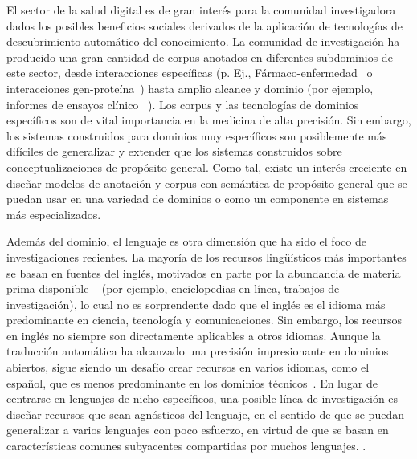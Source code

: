 El sector de la salud digital es de gran interés para la comunidad investigadora dados los posibles beneficios sociales derivados de la aplicación de tecnologías de descubrimiento automático del conocimiento. La comunidad de investigación ha producido una gran cantidad de corpus anotados en diferentes subdominios de este sector, desde interacciones específicas (p. Ej., Fármaco-enfermedad~\cite{goldberg1996drug} o interacciones gen-proteína~\cite{tanabe2005genetag}) hasta amplio alcance y dominio (por ejemplo, informes de ensayos clínico ~\cite{nye2018corpus}).
Los corpus y las tecnologías de dominios específicos son de vital importancia en la medicina de alta precisión.
Sin embargo, los sistemas construidos para dominios muy específicos son posiblemente más difíciles de generalizar y extender que los sistemas construidos sobre conceptualizaciones de propósito general.
Como tal, existe un interés creciente en diseñar modelos de anotación y corpus con semántica de propósito general que se puedan usar en una variedad de dominios o como un componente en sistemas más especializados.

Además del dominio, el lenguaje es otra dimensión que ha sido el foco de investigaciones recientes.
La mayoría de los recursos lingüísticos más importantes se basan en fuentes del inglés, motivados en parte por la abundancia de materia prima disponible ~ (por ejemplo, enciclopedias en línea, trabajos de investigación), lo cual no es sorprendente dado que el inglés es el idioma más predominante en ciencia, tecnología y comunicaciones.
Sin embargo, los recursos en inglés no siempre son directamente aplicables a otros idiomas.
Aunque la traducción automática ha alcanzado una precisión impresionante en dominios abiertos, sigue siendo un desafío crear recursos en varios idiomas, como el español, que es menos predominante en los dominios técnicos~\cite{villegas2018mespen}.
En lugar de centrarse en lenguajes de nicho específicos, una posible línea de investigación es diseñar recursos que sean agnósticos del lenguaje, en el sentido de que se puedan generalizar a varios lenguajes con poco esfuerzo, en virtud de que se basan en características comunes subyacentes compartidas por muchos lenguajes. .

